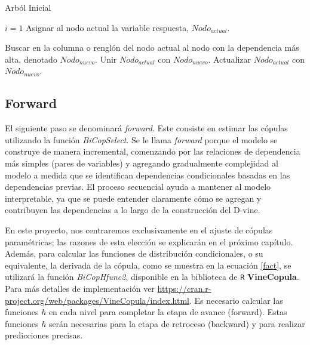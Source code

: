 \begin{algorithm}[H]
      \caption{Arból Inicial}
      \label{algT1}
      \begin{algorithmic}[1]  
        
        \State $i = 1$
        \State Asignar al nodo actual la variable respuesta, $Nodo_{actual}$.
        
          \State Buscar en la columna o renglón del nodo actual al nodo con la dependencia más alta, denotado $Nodo_{nuevo}$.
          \State Unir $Nodo_{actual}$ con $Nodo_{nuevo}$.
          \State Actualizar $Nodo_{actual}$ con $Nodo_{nuevo}$.     
        \EndWhile
       
      \end{algorithmic}
    \end{algorithm}


\subsection{Forward}

\vspace{-0.5cm}
El siguiente paso se denominará \textit{forward}. Este consiste en estimar las cópulas utilizando la función \textit{BiCopSelect}. Se le llama \textit{forward} porque el modelo se construye de manera incremental, comenzando por las relaciones de dependencia más simples (pares de variables) y agregando gradualmente complejidad al modelo a medida que se identifican dependencias condicionales basadas en las dependencias previas. El proceso secuencial ayuda a mantener al modelo interpretable, ya que se puede entender claramente cómo se agregan y contribuyen las dependencias a lo largo de la construcción del D-vine.


En este proyecto, nos centraremos exclusivamente en el ajuste de cópulas paramétricas; las razones de esta elección se explicarán en el próximo capítulo. Además, para calcular las funciones de distribución condicionales, o su equivalente, la derivada de la cópula, como se muestra en la ecuación \eqref{fact}, se utilizará la función \textit{BiCopHfunc2}, disponible en la biblioteca de \texttt{R} \textbf{VineCopula}. Para más detalles de implementación ver \url{https://cran.r-project.org/web/packages/VineCopula/index.html}. Es necesario calcular las funciones $h$ en cada nivel para completar la etapa de avance (forward). Estas funciones $h$ serán necesarias para la etapa de retroceso (backward) y para realizar predicciones precisas.

